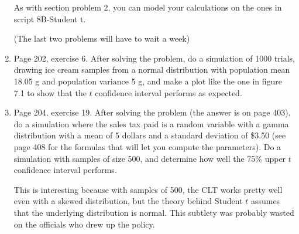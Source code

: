 \documentclass[12pt]{article}
\begin{document}
\begin{enumerate}
As with section problem 2, you can model your calculations on the ones in script 8B-Student t.

\pagebreak

(The last two problems will have to wait a week)

\item Page 202, exercise 6. After solving the problem, do a simulation of 1000 trials, drawing ice cream samples from a normal distribution with population mean 18.05 g and population variance 5 g, and make a plot like the one in figure 7.1 to show that the $t$ confidence interval performs as expected.



\item Page 204, exercise 19. After solving the problem (the answer is on page 403), do a simulation where the sales tax paid is a random variable with a gamma distribution with a mean of 5 dollars and a standard deviation of \$3.50 (see page 408 for the formulas that will let you compute the parameters). Do a simulation with samples of size 500, and determine how well the 75\% upper $t$ confidence interval performs.

This is interesting because with samples of 500, the CLT works pretty well even with a skewed distribution, but the theory behind Student $t$ assumes that the underlying distribution is normal. This subtlety was probably wasted on the officials who drew up the policy.
\end{enumerate}









\pagebreak
\end{document}
